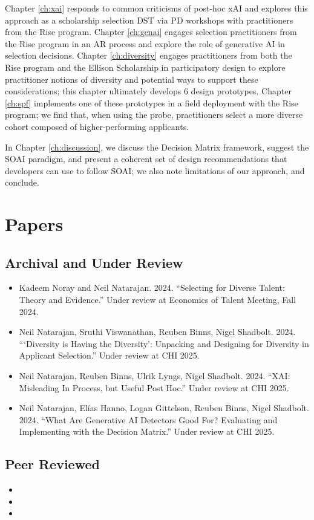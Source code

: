 Chapter \ref{ch:xai} responds to common criticisms of post-hoc xAI and explores this approach as a scholarship selection DST via PD workshops with practitioners from the Rise program. Chapter \ref{ch:genai} engages selection practitioners from the Rise program in an AR process and explore the role of generative AI in selection decisions. Chapter \ref{ch:diversity} engages practitioners from both the Rise program and the Ellison Scholarship in participatory design to explore practitioner notions of diversity and potential ways to support these considerations; this chapter ultimately develops 6 design prototypes. Chapter \ref{ch:spf} implements one of these prototypes in a field deployment with the Rise program; we find that, when using the probe, practitioners select a more diverse cohort composed of higher-performing applicants. 

In Chapter \ref{ch:discussion}, we discuss the Decision Matrix framework, suggest the SOAI paradigm, and present a coherent set of design recommendations that developers can use to follow SOAI; we also note limitations of our approach, and conclude. 

\section{Papers}
\subsection{Archival and Under Review}
\begin{itemize}
    \item Kadeem Noray and Neil Natarajan. 2024. “Selecting for Diverse Talent: Theory and Evidence.” Under review at Economics of Talent Meeting, Fall 2024.
    \item Neil Natarajan, Sruthi Viswanathan, Reuben Binns, Nigel Shadbolt. 2024. “‘Diversity is Having the Diversity’: Unpacking and Designing for Diversity in Applicant Selection.” Under review at CHI 2025.
    \item Neil Natarajan, Reuben Binns, Ulrik Lyngs, Nigel Shadbolt. 2024. “XAI: Misleading In Process, but Useful Post Hoc.” Under review at CHI 2025.
    \item Neil Natarajan, Elías Hanno, Logan Gittelson, Reuben Binns, Nigel Shadbolt. 2024. “What Are Generative AI Detectors Good For? Evaluating and Implementing with the Decision Matrix.” Under review at CHI 2025.
\end{itemize}

\subsection{Peer Reviewed}
\begin{itemize}
    \item {}
    \item {} 
    \item {}
\end{itemize}



